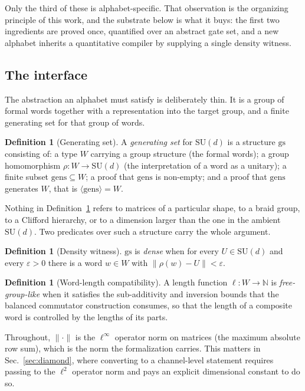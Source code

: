 \documentclass[aps,pra,reprint,nofootinbib,superscriptaddress]{revtex4-2}
\newcommand{\su}[1]{\mathrm{SU}(#1)}
\newcommand{\opn}[1]{\lVert #1 \rVert}
\theoremstyle{plain}
\theoremstyle{definition}
\newtheorem{definition}[theorem]{Definition}
\begin{document}
Only the third of these is alphabet-specific. That observation is the
organizing principle of this work, and the substrate below is what it buys:
the first two ingredients are proved once, quantified over an abstract gate
set, and a new alphabet inherits a quantitative compiler by supplying a single
density witness.

\subsection{The interface}
\label{sec:substrate-interface}

The abstraction an alphabet must satisfy is deliberately thin. It is a group
of formal words together with a representation into the target group, and a
finite generating set for that group of words.

\begin{definition}[Generating set]
\label{def:gs}
A \emph{generating set} for $\su d$ is a structure $\mathrm{gs}$ consisting of:
a type $W$ carrying a group structure (the formal words); a group homomorphism
$\rho \colon W \to \su d$ (the interpretation of a word as a unitary); a finite
subset $\mathrm{gens} \subseteq W$; a proof that $\mathrm{gens}$ is non-empty;
and a proof that $\mathrm{gens}$ generates $W$, that is
$\langle \mathrm{gens}\rangle = W$.
\end{definition}

Nothing in Definition~\ref{def:gs} refers to matrices of a particular shape, to
a braid group, to a Clifford hierarchy, or to a dimension larger than the one
in the ambient $\su d$. Two predicates over such a structure carry the whole
argument.

\begin{definition}[Density witness]
\label{def:dense}
$\mathrm{gs}$ is \emph{dense} when for every $U \in \su d$ and every
$\varepsilon > 0$ there is a word $w \in W$ with
$\opn{\rho(w) - U} < \varepsilon$.
\end{definition}

\begin{definition}[Word-length compatibility]
\label{def:wordlen}
A length function $\ell \colon W \to \mathbb{N}$ is \emph{free-group-like} when
it satisfies the sub-additivity and inversion bounds that the balanced
commutator construction consumes, so that the length of a composite word is
controlled by the lengths of its parts.
\end{definition}

Throughout, $\opn{\cdot}$ is the $\ell^\infty$ operator norm on matrices (the
maximum absolute row sum), which is the norm the formalization carries. This
matters in Sec.~\ref{sec:diamond}, where converting to a channel-level
statement requires passing to the $\ell^2$ operator norm and pays an explicit
dimensional constant to do so.
\end{document}
